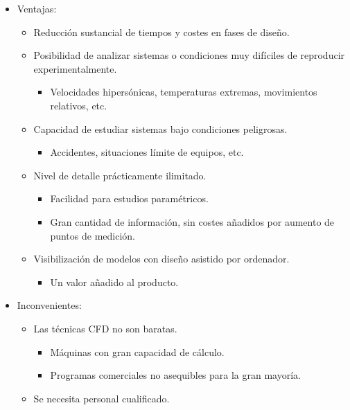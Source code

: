 \begin{itemize}
\item
  Ventajas:

  \begin{itemize}
  \item
    Reducción sustancial de tiempos y costes en fases de diseño.
  \item
    Posibilidad de analizar sistemas o condiciones muy difíciles de
    reproducir experimentalmente.

    \begin{itemize}
    \item
      Velocidades hipersónicas, temperaturas extremas, movimientos
      relativos, etc.
    \end{itemize}
  \item
    Capacidad de estudiar sistemas bajo condiciones peligrosas.

    \begin{itemize}
    \item
      Accidentes, situaciones límite de equipos, etc.
    \end{itemize}
  \item
    Nivel de detalle prácticamente ilimitado.

    \begin{itemize}
    \item
      Facilidad para estudios paramétricos.
    \item
      Gran cantidad de información, sin costes añadidos por aumento de
      puntos de medición.
    \end{itemize}
  \item
    Visibilización de modelos con diseño asistido por ordenador.

    \begin{itemize}
    \item
      Un valor añadido al producto.
    \end{itemize}
  \end{itemize}
\item
  Inconvenientes:

  \begin{itemize}
  \item
    Las técnicas CFD no son baratas.

    \begin{itemize}
    \item
      Máquinas con gran capacidad de cálculo.
    \item
      Programas comerciales no asequibles para la gran mayoría.
    \end{itemize}
  \item
    Se necesita personal cualificado.


\end{itemize}
\end{itemize}
